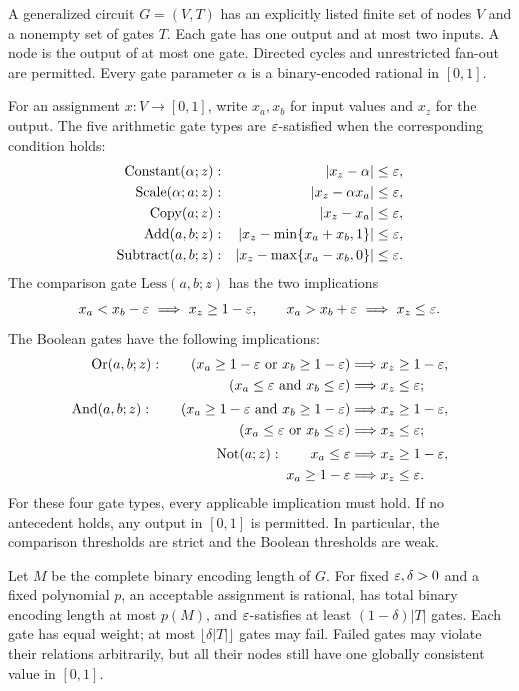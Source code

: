 \begin{definition}\label{def:gcircuit}
A generalized circuit $G=(V,T)$ has an explicitly listed finite set of
nodes $V$ and a nonempty set of gates $T$. Each gate has one output and at
most two inputs. A node is the output of at most one gate. Directed cycles
and unrestricted fan-out are permitted. Every gate parameter $\alpha$ is
a binary-encoded rational in $[0,1]$.

For an assignment $x:V\to[0,1]$, write $x_a,x_b$ for input values and
$x_z$ for the output. The five arithmetic gate types are
$\varepsilon$-satisfied when the corresponding condition holds:
\begin{align*}
 \mathrm{Constant}(\alpha;z)&:&\quad \lvert x_z-\alpha\rvert&\leq\varepsilon,\\
 \mathrm{Scale}(\alpha;a;z)&:& \lvert x_z-\alpha x_a\rvert&\leq\varepsilon,\\
 \mathrm{Copy}(a;z)&:& \lvert x_z-x_a\rvert&\leq\varepsilon,\\
 \mathrm{Add}(a,b;z)&:& \lvert x_z-\min\{x_a+x_b,1\}\rvert&\leq\varepsilon,\\
 \mathrm{Subtract}(a,b;z)&:& \lvert x_z-\max\{x_a-x_b,0\}\rvert&\leq\varepsilon.
\end{align*}
The comparison gate $\mathrm{Less}(a,b;z)$ has the two implications
\[
 x_a<x_b-\eps\ \Longrightarrow\ x_z\geq1-\eps,
 \qquad
 x_a>x_b+\eps\ \Longrightarrow\ x_z\leq\eps.
\]
The Boolean gates have the following implications:
\begin{align*}
 \mathrm{Or}(a,b;z):\qquad
 (x_a\geq1-\varepsilon\ \text{or}\ x_b\geq1-\varepsilon)&\Longrightarrow x_z\geq1-\varepsilon,\\
 (x_a\leq\varepsilon\ \text{and}\ x_b\leq\varepsilon)&\Longrightarrow x_z\leq\varepsilon;\\[2pt]
 \mathrm{And}(a,b;z):\qquad
 (x_a\geq1-\varepsilon\ \text{and}\ x_b\geq1-\varepsilon)&\Longrightarrow x_z\geq1-\varepsilon,\\
 (x_a\leq\varepsilon\ \text{or}\ x_b\leq\varepsilon)&\Longrightarrow x_z\leq\varepsilon;\\[2pt]
 \mathrm{Not}(a;z):\qquad
 x_a\leq\varepsilon&\Longrightarrow x_z\geq1-\varepsilon,\\
 x_a\geq1-\varepsilon&\Longrightarrow x_z\leq\varepsilon.
\end{align*}
For these four gate types, every applicable implication must hold. If no
antecedent holds, any output in $[0,1]$ is permitted. In particular, the
comparison thresholds are strict and the Boolean thresholds are weak.

Let $M$ be the complete binary encoding length of $G$. For fixed
$\varepsilon,\delta>0$ and a fixed polynomial $p$, an acceptable assignment is
rational, has total binary encoding length at most $p(M)$, and
$\varepsilon$-satisfies at least $(1-\delta)|T|$ gates. Each gate has equal weight;
at most $\lfloor\delta|T|\rfloor$ gates may fail. Failed gates may violate
their relations arbitrarily, but all their nodes still have one globally
consistent value in $[0,1]$.
\end{definition}

